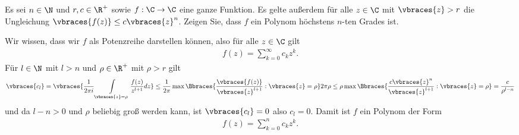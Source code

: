\begin{exercise}
    Es sei $n \in \N$ und $r,c \in \R^+$ sowie $f:\C \to \C$ eine ganze Funktion. Es gelte außerdem für alle $z \in \C$ mit $\vbraces{z} > r$ die Ungleichung $\vbraces{f(z)} \leq c \vbraces{z}^n$. Zeigen Sie, dass $f$ ein Polynom höchstens $n$-ten Grades ist.
\end{exercise}

\begin{solution}
    Wir wissen, dass wir $f$ als Potenzreihe darstellen können, also für alle $z \in \C$ gilt
    \begin{align*}
        f(z) = \sum_{k = 0}^\infty c_k z^k.
    \end{align*}
    Für $l \in \N$ mit $l > n$ und $\rho \in \R^+$ mit $\rho > r$ gilt
    \begin{align*}
        \vbraces{c_l} = \vbraces{ \frac{1}{2\pi i} \int\limits_{\vbraces{z} = \rho} \frac{f(z)}{z^{l + 1}} dz} \leq \frac{1}{2 \pi} \max\Bbraces{\frac{\vbraces{f(z)}}{\vbraces{z}^{l + 1}} : \vbraces{z} = \rho} 2\pi \rho  \leq \rho \max\Bbraces{\frac{c \vbraces{z}^n }{\vbraces{z}^{l + 1}} : \vbraces{z} = \rho} = \frac{c}{\rho^{l - n}}
    \end{align*}
    und da $l - n > 0$ und $\rho$ beliebig groß werden kann, ist $\vbraces{c_l} = 0$ also $c_l = 0$. Damit ist $f$ ein Polynom der Form
    \begin{align*}
        f(z) = \sum_{k = 0}^n c_k z^k.
    \end{align*}
\end{solution}